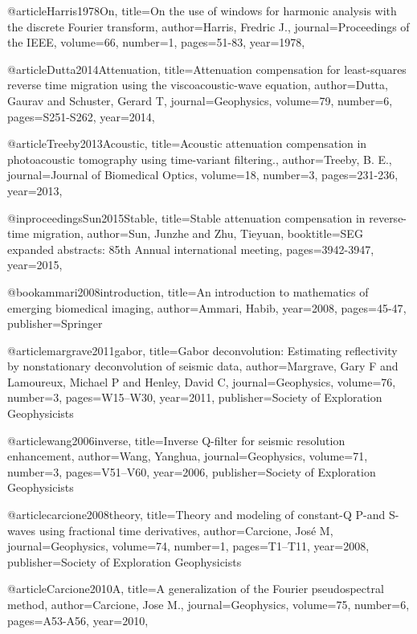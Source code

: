 {@article{Harris1978On,
  title={On the use of windows for harmonic analysis with the discrete {F}ourier transform},
  author={Harris, Fredric J.},
  journal={Proceedings of the IEEE},
  volume={66},
  number={1},
  pages={51-83},
  year={1978},
}

@article{Dutta2014Attenuation,
  title={Attenuation compensation for least-squares reverse time migration using the viscoacoustic-wave equation},
  author={Dutta, Gaurav and Schuster, Gerard T},
  journal={Geophysics},
  volume={79},
  number={6},
  pages={S251-S262},
  year={2014},
}

@article{Treeby2013Acoustic,
  title={Acoustic attenuation compensation in photoacoustic tomography using time-variant filtering.},
  author={Treeby, B. E.},
  journal={Journal of Biomedical Optics},
  volume={18},
  number={3},
  pages={231-236},
  year={2013},
}

@inproceedings{Sun2015Stable,
  title={Stable attenuation compensation in reverse-time migration},
  author={Sun, Junzhe and Zhu, Tieyuan},
  booktitle={SEG expanded abstracts: 85th Annual international meeting},
  pages={3942-3947},
  year={2015},
}

@book{ammari2008introduction,
  title={An introduction to mathematics of emerging biomedical imaging},
  author={Ammari, Habib},
  year={2008},
  pages={45-47},
  publisher={Springer}
}


@article{margrave2011gabor,
  title={Gabor deconvolution: Estimating reflectivity by nonstationary deconvolution of seismic data},
  author={Margrave, Gary F and Lamoureux, Michael P and Henley, David C},
  journal={Geophysics},
  volume={76},
  number={3},
  pages={W15--W30},
  year={2011},
  publisher={Society of Exploration Geophysicists}
}

@article{wang2006inverse,
  title={Inverse {Q}-filter for seismic resolution enhancement},
  author={Wang, Yanghua},
  journal={Geophysics},
  volume={71},
  number={3},
  pages={V51--V60},
  year={2006},
  publisher={Society of Exploration Geophysicists}
}

@article{carcione2008theory,
  title={Theory and modeling of constant-{Q} {P}-and {S}-waves using fractional time derivatives},
  author={Carcione, Jos{\'e} M},
  journal={Geophysics},
  volume={74},
  number={1},
  pages={T1--T11},
  year={2008},
  publisher={Society of Exploration Geophysicists}
}


@article{Carcione2010A,
  title={A generalization of the Fourier pseudospectral method},
  author={Carcione, Jose M.},
  journal={Geophysics},
  volume={75},
  number={6},
  pages={A53-A56},
  year={2010},
}

}
